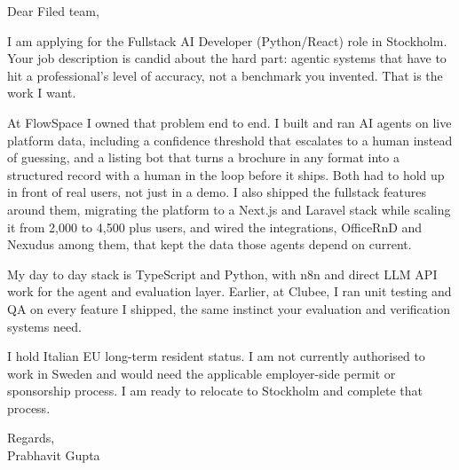 \documentclass[a4paper,11pt]{article}
\begin{document}
Dear Filed team,

I am applying for the Fullstack AI Developer (Python/React) role in Stockholm. Your job description is candid about the hard part: agentic systems that have to hit a professional's level of accuracy, not a benchmark you invented. That is the work I want.

At FlowSpace I owned that problem end to end. I built and ran AI agents on live platform data, including a confidence threshold that escalates to a human instead of guessing, and a listing bot that turns a brochure in any format into a structured record with a human in the loop before it ships. Both had to hold up in front of real users, not just in a demo. I also shipped the fullstack features around them, migrating the platform to a Next.js and Laravel stack while scaling it from 2,000 to 4,500 plus users, and wired the integrations, OfficeRnD and Nexudus among them, that kept the data those agents depend on current.

My day to day stack is TypeScript and Python, with n8n and direct LLM API work for the agent and evaluation layer. Earlier, at Clubee, I ran unit testing and QA on every feature I shipped, the same instinct your evaluation and verification systems need.

I hold Italian EU long-term resident status. I am not currently authorised to work in Sweden and would need the applicable employer-side permit or sponsorship process. I am ready to relocate to Stockholm and complete that process.

Regards,\\
Prabhavit Gupta
\end{document}
